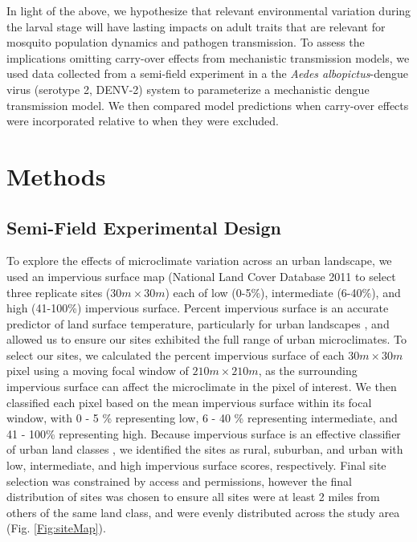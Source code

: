 \documentclass[12pt]{article}
\begin{document}
In light of the above, we hypothesize that relevant environmental variation during the larval stage will have lasting impacts on adult traits that are relevant for mosquito population dynamics and pathogen transmission. To assess the implications omitting carry-over effects from mechanistic transmission models, we used data collected from a semi-field experiment in a the \textit{Aedes albopictus}-dengue virus (serotype 2, DENV-2) system to parameterize a mechanistic dengue transmission model. We then compared model predictions when carry-over effects were incorporated relative to when they were excluded.


\section{Methods}
\subsection{Semi-Field Experimental Design}

To explore the effects of microclimate variation across an urban landscape, we used an impervious surface map (National Land Cover Database 2011 \citep{xian2011} to select three replicate sites ($30m \times 30m$) each of low (0-5\%), intermediate (6-40\%), and high (41-100\%) impervious surface. Percent impervious surface is an accurate predictor of land surface temperature, particularly for urban landscapes \citep{yuan2007}, and allowed us to ensure our sites exhibited the full range of urban microclimates. To select our sites, we calculated the percent impervious surface of each $30m \times 30m$ pixel using a moving focal window of $210m \times 210m$, as the surrounding impervious surface can affect the microclimate in the pixel of interest. We then classified each pixel based on the mean impervious surface within its focal window, with 0 - 5 \% representing low, 6 - 40 \% representing intermediate, and 41 - 100\% representing high. Because impervious surface is an effective classifier of urban land classes \citep{lu2006}, we identified the sites as rural, suburban, and urban with low, intermediate, and high impervious surface scores, respectively. Final site selection was constrained by access and permissions, however the final distribution of sites was chosen to ensure all sites were at least 2 miles from others of the same land class, and were evenly distributed across the study area (Fig. \ref{Fig:siteMap}).
\end{document}
